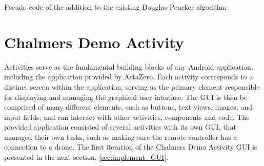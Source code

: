 \begin{algorithm}[H] \label{DP_code}
\caption{Pseudo code of the addition to the existing Douglas-Peucker algorithm}
\SetAlgoLined
{}
\end{algorithm}

\section{Chalmers Demo Activity} \label{sec:chalmers_demo_activity}


Activities serve as the fundamental building blocks of any Android application, including the application provided by AstaZero. Each activity corresponds to a distinct screen within the application, serving as the primary element responsible for displaying and managing the graphical user interface. The GUI is then be comprised of many different elements, such as buttons, text views, images, and input fields, and can interact with other activities, components and code. The provided application consisted of several activities with its own GUI, that managed their own tasks, such as making sure the remote controller has a connection to a drone. The first iteration of the Chalmers Demo Activity GUI is presented in the next section, \ref{sec:implement_GUI}. 



